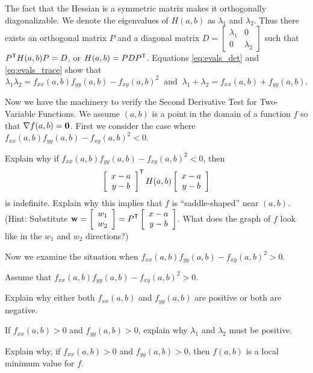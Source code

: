 The fact that the Hessian is a symmetric matrix makes it orthogonally diagonalizable. We denote the eigenvalues of $H(a,b)$ as $\lambda_1$ and $\lambda_2$. Thus there exists an orthogonal matrix $P$ and a diagonal matrix $D = \left[ \begin{array}{cc} \lambda_1&0 \\ 0&\lambda_2 \end{array} \right]$ such that $P^{\mathsf{T}}H(a,b)P=D$, or $H(a,b) = PDP^{\mathsf{T}}$. Equations \ref{eq:evals_det} and \ref{eq:evals_trace}  show that 
\[\lambda_1\lambda_2 = f_{xx}(a,b)f_{yy}(a,b)-f_{xy}(a,b)^2 \ \text{ and  } \ \lambda_1 + \lambda_2 = f_{xx}(a,b) + f_{yy}(a,b).\]

Now we have the machinery to verify the Second Derivative Test for Two-Variable Functions. We assume $(a,b)$ is a point in the domain of a function $f$ so that $\nabla f(a,b) = \mathbf{0}$. First we consider the case where $f_{xx}(a,b)f_{yy}(a,b)-f_{xy}(a,b)^2<0$.


\begin{pactivity} Explain why if $f_{xx}(a,b)f_{yy}(a,b)-f_{xy}(a,b)^2<0$, then 
\[\left[ \begin{array}{c} x-a \\ y-b \end{array} \right]^{\mathsf{T}} H(a,b) \left[ \begin{array}{c} x-a \\ y-b \end{array} \right]\]
 is indefinite. Explain why this implies that $f$ is ``saddle-shaped'' near $(a,b)$. (Hint: Substitute $\mathbf{w} = \left[ \begin{array}{c} w_1\\w_2 \end{array} \right] = P^{\mathsf{T}}\left[ \begin{array}{c} x-a \\ y-b \end{array} \right]$. What does the graph of $f$ look like in the $w_1$ and $w_2$ directions?)

 
\end{pactivity}

Now we examine the situation when $f_{xx}(a,b)f_{yy}(a,b)-f_{xy}(a,b)^2>0$. 


\begin{pactivity} Assume that $f_{xx}(a,b)f_{yy}(a,b)-f_{xy}(a,b)^2>0$.
	\ba
	\item Explain why either both $f_{xx}(a,b)$ and $f_{yy}(a,b)$ are positive or both are negative.

 
	\item If $f_{xx}(a,b)>0$ and $f_{yy}(a,b)>0$, explain why $\lambda_1$ and $\lambda_2$ must be positive. 

	\item Explain why, if $f_{xx}(a,b)>0$ and $f_{yy}(a,b)>0$, then $f(a,b)$ is a local minimum value for $f$. 

	\ea
\end{pactivity}



